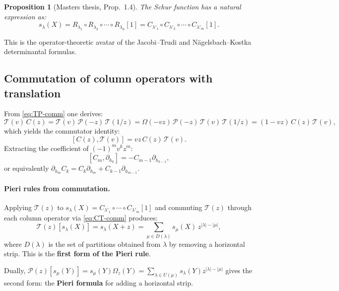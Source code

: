 \documentclass[11pt]{article}
\theoremstyle{plain}
\newtheorem{proposition}[theorem]{Proposition}
\theoremstyle{definition}
\begin{document}
\begin{proposition}[Masters thesis, Prop.~1.4]
The Schur function has a natural expression as:
\[
s_\lambda(X) = R_{\lambda_1} \circ R_{\lambda_2} \circ \cdots \circ R_{\lambda_n}[1]
= C_{\lambda'_1} \circ C_{\lambda'_2} \circ \cdots \circ C_{\lambda'_m}[1].
\]
\end{proposition}
This is the operator-theoretic avatar of the Jacobi--Trudi and N\"agelsbach--Kostka determinantal formulas.

\subsection{Commutation of column operators with translation}
From \eqref{eq:TP-comm} one derives:
\begin{equation}\label{eq:CT-comm}
\mathcal{T}(v)\, C(z) = \mathcal{T}(v)\,\mathcal{P}(-z)\,\mathcal{T}(1/z)
= \Omega(-vz)\,\mathcal{P}(-z)\,\mathcal{T}(v)\,\mathcal{T}(1/z)
= (1-vz)\, C(z)\, \mathcal{T}(v),
\end{equation}
which yields the commutator identity:
\begin{equation}\label{eq:CT-bracket}
[C(z), \mathcal{T}(v)] = vz\, C(z)\, \mathcal{T}(v).
\end{equation}
Extracting the coefficient of $(-1)^m v^k z^m$:
\[
[C_m, \partial_{h_k}] = -C_{m-1}\partial_{h_{k-1}},
\]
or equivalently $\partial_{h_m} C_k = C_k \partial_{h_m} + C_{k-1}\partial_{h_{m-1}}$.

\paragraph{Pieri rules from commutation.}
Applying $\mathcal{T}(z)$ to $s_\lambda(X) = C_{\lambda'_1} \circ \cdots \circ C_{\lambda'_m}[1]$
and commuting $\mathcal{T}(z)$ through each column operator via \eqref{eq:CT-comm} produces:
\begin{equation}\label{eq:pieri-col}
\mathcal{T}(z)[s_\lambda(X)] = s_\lambda(X+z) = \sum_{\mu \in D(\lambda)} s_\mu(X)\, z^{|\lambda|-|\mu|},
\end{equation}
where $D(\lambda)$ is the set of partitions obtained from $\lambda$ by removing a horizontal strip.
This is the \textbf{first form of the Pieri rule}.

Dually, $\mathcal{P}(z)[s_\mu(Y)] = s_\mu(Y)\Omega_z(Y) = \sum_{\lambda \in U(\mu)} s_\lambda(Y) z^{|\lambda|-|\mu|}$
gives the second form: the \textbf{Pieri formula} for adding a horizontal strip.

\end{document}
